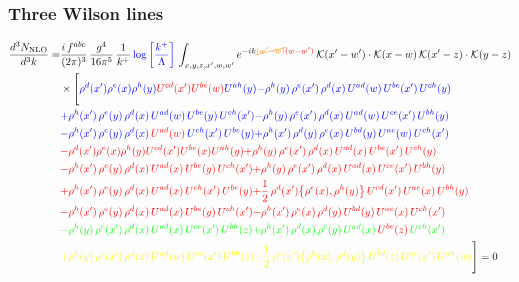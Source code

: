 \documentclass[9pt]{article}
\numberwithin{equation}{section}
\begin{document}
\subsubsection{Three Wilson lines}
\begin{align}
    \frac{d^{3}N_{\rm NLO}}{d^{3}k}= & \frac{i\,f^{abc}}{(2\pi)^{3}}\,\frac{g^{4}}{16\pi^{5}}\,\frac{1}{k^{+}}\,{\color{blue}\log{\left[\frac{k^{+}}{\Lambda}\right]}}\,\int_{x,y,z,x',w,w'}e^{-ik{\color{orange}\cancel{(w'-w)}}{\color{red}(w-w')}}\,\mathcal{K}(x'-w')\cdot\mathcal{K}(x-w)\,\mathcal{K}(x'-z)\cdot\mathcal{K}(y-z)\notag \\ & \times\Bigg[{\color{blue}\rho^{d}(x') \rho^{e}(x) \rho^{h}(y) {\color{red}U^{cd}(x')} {\color{red}U^{be}(w)} U^{a h}(y)}{\color{blue}-\rho^{h}(y)\,\rho^{e}(x')\,\rho^{d}(x)\,U^{ad}(w)\,U^{be}(x')\,U^{ch}(y)}\notag \\
&{\color{blue}+\rho^{h}(x')\,\rho^{e}(y)\,\rho^{d}(x)\,U^{ad}(w)\,U^{be}(y)\,U^{ch}(x')}{\color{blue}-\rho^{h}(y)\,\rho^{e}(x')\,\rho^{d}(x)\,U^{ad}(w)\,U^{ce}(x')\,U^{bh}(y)} \notag \\ &{\color{blue}-\rho^{h}(x')\,\rho^{e}(y)\,\rho^{d}(x)\,{\color{red}U^{ad}(w)}\,U^{ch}(x')\,U^{be}(y)}{\color{blue}+\rho^{h}(x')\,\rho^{d}(y)\,\rho^{e}(x)\,U^{bd}(y)\,U^{ae}(w)\,U^{ch}(x')}\notag \\
&{\color{red}-\rho^{d}(x') \rho^{e}(x) \rho^{h}(y) {\color{red}U^{cd}(x')} U^{b e}(x) U^{a h}(y)}{\color{red}+\rho^{h}(y)\,\rho^{e}(x')\,\rho^{d}(x)\,U^{ad}(x)\,U^{be}(x')\,U^{ch}(y)}\notag \\ & {\color{red}-\rho^{h}(x')\,\rho^{e}(y)\,\rho^{d}(x)\,U^{ad}(x)\,U^{be}(y)\,U^{ch}(x')} {\color{red}+\rho^{h}(y)\,\rho^{e}(x')\,\rho^{d}(x)\,U^{ad}(x)\,U^{ce}(x')\,U^{bh}(y)}\notag \\ & {\color{red}+\rho^{h}(x')\,\rho^{e}(y)\,\rho^{d}(x)\,{\color{red}U^{ad}(x)}\,U^{ch}(x')\,U^{be}(y)}{\color{red}+\frac{1}{2}\,\rho^{d}(x')\big\{\rho^{e}(x),\rho^{h}(y)\big\}\,U^{cd}(x')\,U^{ae}(x)\,U^{bh}(y)}\notag \\ & {\color{red}-\rho^{h}(x')\,\rho^{e}(y)\,\rho^{d}(x)\,U^{ad}(x)\,U^{be}(y)\,U^{ch}(x')}{\color{red}-\rho^{h}(x')\,\rho^{e}(x)\,\rho^{d}(y)\,U^{bd}(y)\,U^{ae}(x)\,U^{ch}(x')}\notag \\ & {\color{green}-\rho^{h}(y)\,\rho^{e}(x')\,\rho^{d}(x)\,U^{ad}(x)\,U^{ce}(x')\,U^{bh}(z)}{\color{green}+\rho^{h}(x')\,\rho^{d}(x)\,\rho^{e}(y)\,U^{ad}(x)\,{\color{red}U^{be}(z)}\,U^{ch}(x')}\notag \\ & {\color{yellow}+\rho^{h}(y)\,\rho^{e}(x')\,\rho^{d}(x)\,U^{ad}(w)\,U^{ce}(x')\,U^{bh}(z)}{\color{yellow}-\frac{1}{2}\,\rho^{e}(x')\big\{\rho^{h}(x),\rho^{d}(y)\big\}\,U^{bd}(z)\,U^{ce}(x')\,U^{ah}(w)}\Bigg] = 0
\end{align}
\end{document}
